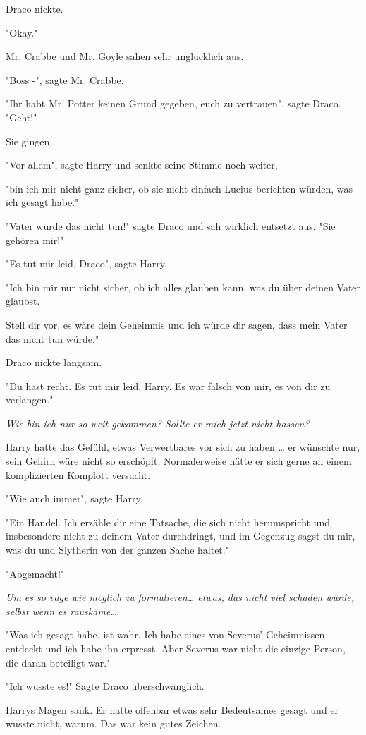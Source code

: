 {Draco nickte.

"Okay."

Mr. Crabbe und Mr. Goyle sahen sehr unglücklich aus.

"Boss -", sagte Mr. Crabbe.

"Ihr habt Mr. Potter keinen Grund gegeben, euch zu vertrauen", sagte Draco. "Geht!"

Sie gingen.

"Vor allem", sagte Harry und senkte seine Stimme noch weiter,

"bin ich mir nicht ganz sicher, ob sie nicht einfach Lucius berichten würden, was ich gesagt habe."

"Vater würde das nicht tun!" sagte Draco und sah wirklich entsetzt aus. "Sie gehören mir!"

"Es tut mir leid, Draco", sagte Harry.

"Ich bin mir nur nicht sicher, ob ich alles glauben kann, was du über deinen Vater glaubst.

Stell dir vor, es wäre dein Geheimnis und ich würde dir sagen, dass mein Vater das nicht tun würde."

Draco nickte langsam.

"Du hast recht. Es tut mir leid, Harry. Es war falsch von mir, es von dir zu verlangen."

\emph{Wie bin ich nur so weit gekommen? Sollte er mich jetzt nicht hassen?}

Harry hatte das Gefühl, etwas Verwertbares vor sich zu haben … er wünschte nur, sein Gehirn wäre nicht so erschöpft. Normalerweise hätte er sich gerne an einem komplizierten Komplott versucht.

"Wie auch immer", sagte Harry.

"Ein Handel. Ich erzähle dir eine Tatsache, die sich nicht herumspricht und insbesondere nicht zu deinem Vater durchdringt, und im Gegenzug sagst du mir, was du und Slytherin von der ganzen Sache haltet."

"Abgemacht!"

\emph{Um es so vage wie möglich zu formulieren… etwas, das nicht viel schaden würde, selbst wenn es rauskäme…}

"Was ich gesagt habe, ist wahr. Ich habe eines von Severus' Geheimnissen entdeckt und ich habe ihn erpresst. Aber Severus war nicht die einzige Person, die daran beteiligt war."

"Ich wusste es!" Sagte Draco überschwänglich.

Harrys Magen sank. Er hatte offenbar etwas sehr Bedeutsames gesagt und er wusste nicht, warum. Das war kein gutes Zeichen.

}
